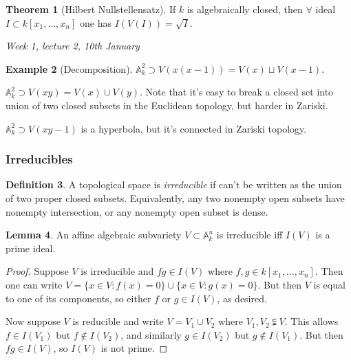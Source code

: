 \documentclass{article}
\newcommand{\A}{\mathbb{A}}
\theoremstyle{definition}
\newtheorem{defn}{Definition}[subsection]
\newtheorem{thm}[defn]{Theorem}
\newtheorem{lemma}[defn]{Lemma}
\newtheorem{example}[defn]{Example}
\begin{document}
\begin{thm}[Hilbert Nullstellensatz]
If $k$ is algebraically closed, then $\forall$ ideal $I\subset k[x_1,\ldots,x_n]$ one has $I(V(I))=\sqrt I$.
\end{thm}

\begin{flushright}
\textit{Week 1, lecture 2, 10th January}
\end{flushright}

\begin{example}[Decomposition]
$\A_k^2\supset V(x(x-1))=V(x)\sqcup V(x-1)$.

$\A_k^2\supset V(xy)=V(x)\cup V(y)$. Note that it's easy to break a closed set into union of two closed subsets in the Euclidean topology, but harder in Zariski.

$\A_k^2\supset V(xy-1)$ is a hyperbola, but it's connected in Zariski topology.
\end{example}

\subsubsection{Irreducibles}

\begin{defn}
A topological space is \textit{irreducible} if can't be written as the union of two proper closed subsets. Equivalently, any two nonempty open subsets have nonempty intersection, or any nonempty open subset is dense.
\end{defn}

\begin{lemma}
\label{lemma:svirrediffprimeideal}
An affine algebraic subvariety $V\subset\A_k^n$ is irreducible iff $I(V)$ is a prime ideal.
\end{lemma}
\begin{proof}
Suppose $V$ is irreducible and $fg\in I(V)$ where $f,g\in k[x_1,\ldots,x_n]$. Then one can write $V=\{x\in V:f(x)=0\}\cup\{x\in V:g(x)=0\}$. But then $V$ is equal to one of its components, so either $f$ or $g\in I(V)$, as desired.

Now suppose $V$ is reducible and write $V=V_1\cup V_2$ where $V_1,V_2\subsetneqq V$. This allows $f\in I(V_1)$ but $f\notin I(V_2)$, and similarly $g\in I(V_2)$ but $g\notin I(V_1)$. But then $fg\in I(V)$, so $I(V)$ is not prime.
\end{proof}
\end{document}
